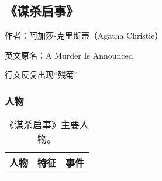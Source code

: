 \subsection{《谋杀启事》}

作者：阿加莎-克里斯蒂（Agatha Christie）

英文原名：A Murder Is Announced

行文反复出现“残菊”

\subsubsection{人物}
\begin{longtable}{p{}|p{}|p{}}
    \caption{《谋杀启事》主要人物。}\\
\hline
人物 &	特征 &	事件 \\
\hline
\endhead

\hline
\endfoot


\end{longtable}
